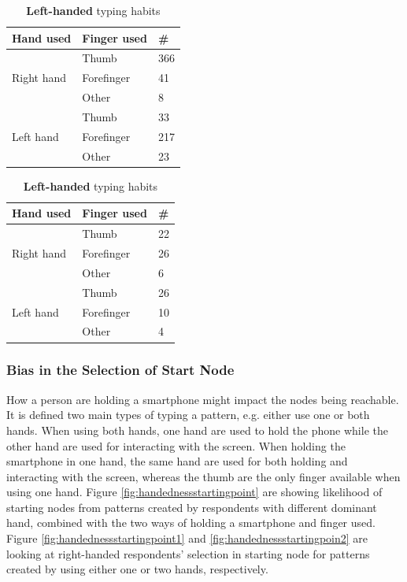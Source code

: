       \begin{table}[H]
        \parbox{.5\linewidth}{
          \centering
          \begin{tabular}{ l | l | l }
            \hline
            {\bf Hand used} & {\bf Finger used} & {\bf \#} \\ \hline
            \multirow{3}{*}{Right hand} & Thumb & 366 \\
            & Forefinger & 41 \\
            & Other & 8 \\ \hline
            \multirow{3}{*}{Left hand} & Thumb & 33 \\
            & Forefinger & 217 \\
            & Other & 23 \\ \hline
          \end{tabular}
          \caption{{\bf Right-handed} typing habits}
          \label{tab:righthandfinger}
        }
        \hfill
        \parbox{.5\linewidth}{
          \centering
          \begin{tabular}{ l | l | l }
            \hline
            {\bf Hand used} & {\bf Finger used} & {\bf \#} \\ \hline
            \multirow{3}{*}{Right hand} & Thumb & 22 \\ 
            & Forefinger & 26 \\
            & Other & 6 \\ \hline
            \multirow{3}{*}{Left hand} & Thumb & 26 \\ 
            & Forefinger & 10 \\
            & Other & 4 \\ \hline
          \end{tabular}
          \caption{{\bf Left-handed} typing habits}
          \label{tab:lefthandfinger}
        }
      \end{table}

    \subsubsection{Bias in the Selection of Start Node}
    How a person are holding a smartphone might impact the nodes being reachable. It is defined two main types of typing a pattern, e.g. either use one or both hands. When using both hands, one hand are used to hold the phone while the other hand are used for interacting with the screen. When holding the smartphone in one hand, the same hand are used for both holding and interacting with the screen, whereas the thumb are the only finger available when using one hand. Figure \ref{fig:handednessstartingpoint} are showing likelihood of starting nodes from patterns created by respondents with different dominant hand, combined with the two ways of holding a smartphone and finger used. Figure \ref{fig:handednessstartingpoint1} and \ref{fig:handednessstartingpoin2} are looking at right-handed respondents' selection in starting node for patterns created by using either one or two hands, respectively. 

